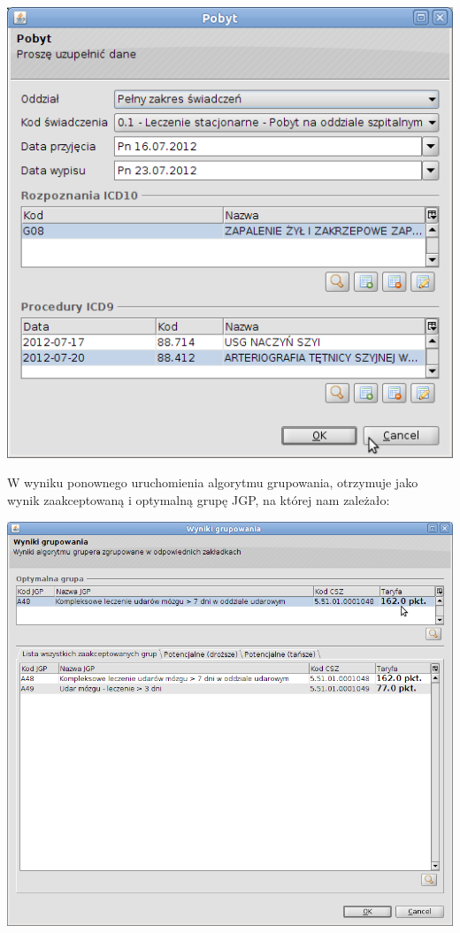 \includegraphics[scale=0.4]{images/gruper14}

W wyniku ponownego uruchomienia algorytmu grupowania, otrzymuje jako wynik zaakceptowaną i optymalną grupę JGP, na której nam zależało:

\includegraphics[scale=0.4]{images/gruper15}


